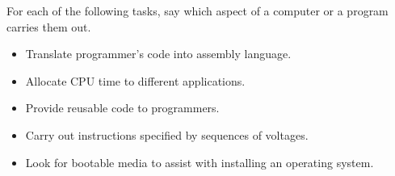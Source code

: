 \begin{exercise}
    For each of the following tasks, say which aspect of a computer or a program carries them out.
    \begin{itemize}
        \item Translate programmer's code into assembly language.
        \item Allocate CPU time to different applications.
        \item Provide reusable code to programmers.
        \item Carry out instructions specified by sequences of voltages.
        \item Look for bootable media to assist with installing an operating system.
    \end{itemize}
\end{exercise}


